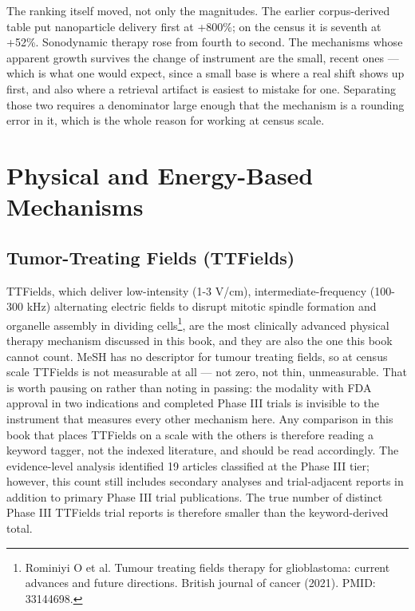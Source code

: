\documentclass[11pt,twoside,openright]{report}
\begin{document}
The ranking itself moved, not only the magnitudes. The earlier corpus-derived table put nanoparticle delivery first at +800\%; on the census it is seventh at +52\%. Sonodynamic therapy rose from fourth to second. The mechanisms whose apparent growth survives the change of instrument are the small, recent ones --- which is what one would expect, since a small base is where a real shift shows up first, and also where a retrieval artifact is easiest to mistake for one. Separating those two requires a denominator large enough that the mechanism is a rounding error in it, which is the whole reason for working at census scale.

\section{Physical and Energy-Based Mechanisms}

\subsection{Tumor-Treating Fields (TTFields)}

TTFields, which deliver low-intensity (1-3 V/cm), intermediate-frequency (100-300 kHz) alternating electric fields to disrupt mitotic spindle formation and organelle assembly in dividing cells\footnote{Rominiyi O et al. Tumour treating fields therapy for glioblastoma: current advances and future directions. British journal of cancer (2021). PMID: 33144698.}, are the most clinically advanced physical therapy mechanism discussed in this book, and they are also the one this book cannot count. MeSH has no descriptor for tumour treating fields, so at census scale TTFields is not measurable at all --- not zero, not thin, unmeasurable. That is worth pausing on rather than noting in passing: the modality with FDA approval in two indications and completed Phase III trials is invisible to the instrument that measures every other mechanism here. Any comparison in this book that places TTFields on a scale with the others is therefore reading a keyword tagger, not the indexed literature, and should be read accordingly. The evidence-level analysis identified 19 articles classified at the Phase III tier; however, this count still includes secondary analyses and trial-adjacent reports in addition to primary Phase III trial publications. The true number of distinct Phase III TTFields trial reports is therefore smaller than the keyword-derived total.
\end{document}
